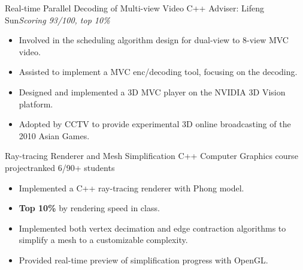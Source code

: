 \documentclass[11pt,a4paper]{moderncv/moderncv}
\begin{document}
{Real-time Parallel Decoding of Multi-view Video}
{C++}
{Adviser: Lifeng Sun}{\textit{Scoring 93/100, top 10\%}}
{
\begin{itemize}
	\item Involved in the scheduling algorithm design for dual-view to 8-view MVC video.
	\item Assisted to implement a MVC enc/decoding tool, focusing on the decoding.
	\item Designed and implemented a 3D MVC player on the NVIDIA 3D Vision platform.
	\item Adopted by CCTV to provide experimental 3D online broadcasting of the 2010 Asian Games.
\end{itemize}
}



{Ray-tracing Renderer and Mesh Simplification}
{C++}
{Computer Graphics course project}{ranked 6/90+ students}
{{
\begin{itemize}
	\item Implemented a C++ ray-tracing renderer with Phong model.
	\item \textbf{Top 10\%} by rendering speed in class.
	\item Implemented both vertex decimation and edge contraction algorithms to simplify a mesh to a customizable complexity.
	\item Provided real-time preview of simplification progress with OpenGL.
\end{itemize}}
}
\end{document}

